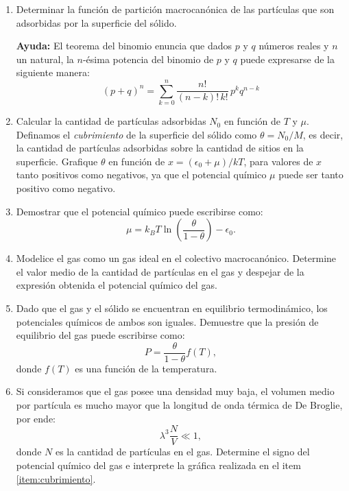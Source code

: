 \documentclass[a4paper,11pt]{article}
\begin{document}
\begin{enumerate}[label=(\alph*),
                  leftmargin=2\parindent,
                  rightmargin=2\parindent]

    \item{Determinar la función de partición macrocanónica de las 
          partículas que son adsorbidas por la superficie del sólido.}

    {\small
    \textbf{Ayuda:}
    El teorema del binomio enuncia que dados $p$ y $q$ números reales y $n$ un
    natural, la $n$-ésima potencia del binomio de $p$ y $q$ puede expresarse
    de la siguiente manera:
    $$ (p + q)^n = \sum_{k=0}^n \frac{n!}{(n-k)! \, k!} \, p^k q^{n-k} $$
    }

    \item{\label{item:cubrimiento}
          Calcular la cantidad de partículas adsorbidas $N_0$ en función de 
          $T$ y $\mu$.
          Definamos el \emph{cubrimiento} de la superficie del sólido como 
          $\theta = N_0/M$, es decir, la cantidad de partículas adsorbidas 
          sobre la cantidad de sitios en la superficie.
          Grafique $\theta$ en función de $x = (\epsilon_0 + \mu)/kT$, para 
          valores de $x$ tanto positivos como negativos, ya que el potencial 
          químico $\mu$ puede ser tanto positivo como negativo.}
    
    \item{Demostrar que el potencial químico puede escribirse 
          como:
          $$
          \mu =
          k_B T \ln \left( \frac{\theta}{1 - \theta} \right) - \epsilon_0.
          $$
          }
    
    \item{Modelice el gas como un gas ideal en el colectivo macrocanónico.
          Determine el valor medio de la cantidad de partículas en el gas y 
          despejar de la expresión obtenida el potencial químico del gas.
          }
    
    \item{Dado que el gas y el sólido se encuentran en equilibrio 
          termodinámico, los potenciales químicos de ambos son iguales. 
          Demuestre que la presión de equilibrio del gas puede escribirse 
          como:
          $$ P = \frac{\theta}{1 - \theta} f(T), $$
          donde $f(T)$ es una función de la temperatura.
          }
    
    \item{Si consideramos que el gas posee una densidad muy baja, el volumen 
          medio por partícula es mucho mayor que la longitud de onda térmica 
          de De Broglie, por ende:
          $$ \lambda^3 \frac{N}{V} \ll 1, $$
          donde $N$ es la cantidad de partículas en el gas.
          Determine el signo del potencial químico del gas e interprete la 
          gráfica realizada en el item \ref{item:cubrimiento}. }

\end{enumerate}
\end{document}

